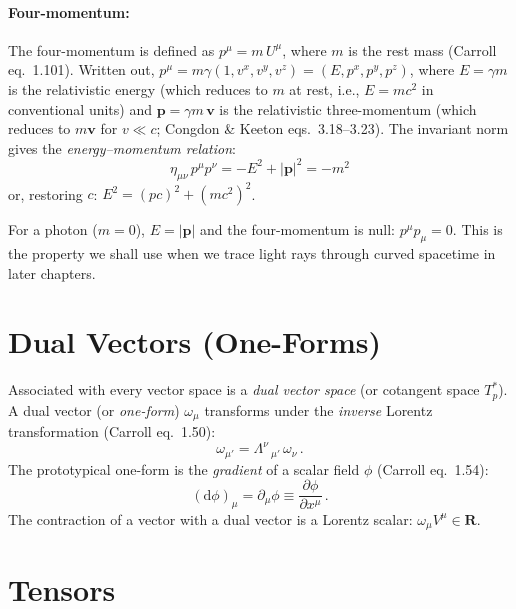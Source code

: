 \paragraph{Four-momentum:} The four-momentum is defined as
$p^\mu = m\, U^\mu$, where $m$ is the rest mass
(Carroll eq.~1.101).
Written out, $p^\mu = m\gamma(1, v^x, v^y, v^z) = (E, p^x, p^y, p^z)$,
where $E = \gamma m$ is the relativistic energy (which reduces to $m$
at rest, i.e., $E = mc^2$ in conventional units) and
$\mathbf{p} = \gamma m\,\mathbf{v}$ is the relativistic three-momentum
(which reduces to $m\mathbf{v}$ for $v \ll c$;
Congdon \& Keeton eqs.~3.18--3.23).
The invariant norm gives the \emph{energy--momentum relation}:
\begin{equation}
    \boxed{
    \eta_{\mu\nu}\, p^\mu p^\nu = -E^2 + |\mathbf{p}|^2 = -m^2
    }
    \label{eq:energy_momentum}
\end{equation}
or, restoring $c$: $E^2 = (pc)^2 + (mc^2)^2$.

For a photon ($m = 0$), $E = |\mathbf{p}|$ and the four-momentum
is null: $p^\mu p_\mu = 0$.  This is the property we shall use when we
trace light rays through curved spacetime in later chapters.


\section{Dual Vectors (One-Forms)}
\label{sec:dual_vectors}

Associated with every vector space is a \emph{dual vector space} (or
cotangent space $T_p^*$).  A dual vector (or \emph{one-form})
$\omega_\mu$ transforms under the \emph{inverse} Lorentz transformation
(Carroll eq.~1.50):
\begin{equation}
    \omega_{\mu'} = \Lambda^\nu{}_{\ \mu'}\, \omega_\nu \,.
    \label{eq:dual_transform}
\end{equation}
The prototypical one-form is the \emph{gradient} of a scalar field
$\phi$ (Carroll eq.~1.54):
\begin{equation}
    (\mathrm{d}\phi)_\mu = \partial_\mu \phi
    \equiv \frac{\partial\phi}{\partial x^\mu} \,.
    \label{eq:gradient}
\end{equation}
The contraction of a vector with a dual vector is a Lorentz scalar:
$\omega_\mu V^\mu \in \mathbf{R}$.


\section{Tensors}
\label{sec:tensors}

